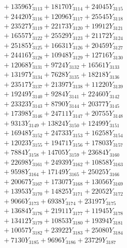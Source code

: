 \documentclass[a4paper,10pt]{article}
\begin{document}
{\begin{align}
&\;  + 13596 Y_{3113} + 18170 Y_{3114} + 24045 Y_{3115} \\[0.3ex]
&\;  + 24420 Y_{3116} + 12096 Y_{3117} + 25545 Y_{3118} \\[0.5ex]\allowbreak
&\;  + 23527 Y_{3119} + 22173 Y_{3120} + 19912 Y_{3121} \\[0.3ex]
&\;  + 16557 Y_{3122} + 25529 Y_{3123} + 21172 Y_{3124} \\[0.3ex]
&\;  + 25185 Y_{3125} + 16631 Y_{3126} + 20459 Y_{3127} \\[0.3ex]
&\;  + 24416 Y_{3128} + 10948 Y_{3129} + 12716 Y_{3130} \\[0.3ex]
&\;  + 12068 Y_{3131} + 9724 Y_{3132} + 16561 Y_{3133} \\[0.3ex]
&\;  + 13197 Y_{3134} + 7628 Y_{3135} + 18218 Y_{3136} \\[0.3ex]
&\;  + 23517 Y_{3137} + 21397 Y_{3138} + 11220 Y_{3139} \\[0.3ex]
&\;  + 19249 Y_{3140} + 9284 Y_{3141} + 22460 Y_{3142} \\[0.3ex]
&\;  + 23323 Y_{3143} + 8790 Y_{3144} + 20377 Y_{3145} \\[0.3ex]
&\;  + 17398 Y_{3146} + 24711 Y_{3147} + 20755 Y_{3148} \\[0.5ex]\allowbreak
&\;  + 9313 Y_{3149} + 13824 Y_{3150} + 12499 Y_{3151} \\[0.3ex]
&\;  + 16948 Y_{3152} + 24733 Y_{3153} + 16258 Y_{3154} \\[0.3ex]
&\;  + 12023 Y_{3155} + 19471 Y_{3156} + 17803 Y_{3157} \\[0.3ex]
&\;  + 7884 Y_{3158} + 14705 Y_{3159} + 23684 Y_{3160} \\[0.3ex]
&\;  + 22698 Y_{3161} + 24939 Y_{3162} + 10858 Y_{3163} \\[0.3ex]
&\;  + 9598 Y_{3164} + 17149 Y_{3165} + 25025 Y_{3166} \\[0.3ex]
&\;  + 20067 Y_{3167} + 17307 Y_{3168} + 13056 Y_{3169} \\[0.3ex]
&\;  + 13953 Y_{3170} + 14825 Y_{3171} + 22052 Y_{3172} \\[0.3ex]
&\;  + 9066 Y_{3173} + 6938 Y_{3174} + 23197 Y_{3175} \\[0.3ex]
&\;  + 13684 Y_{3176} + 21911 Y_{3177} + 11945 Y_{3178} \\[0.5ex]\allowbreak
&\;  + 13412 Y_{3179} + 10853 Y_{3180} + 19394 Y_{3181} \\[0.3ex]
&\;  + 10057 Y_{3182} + 23922 Y_{3183} + 25080 Y_{3184} \\[0.3ex]
&\;  + 7130 Y_{3185} + 9696 Y_{3186} + 23729 Y_{3187} \\[0.3ex]

\end{align}}
\end{document}
